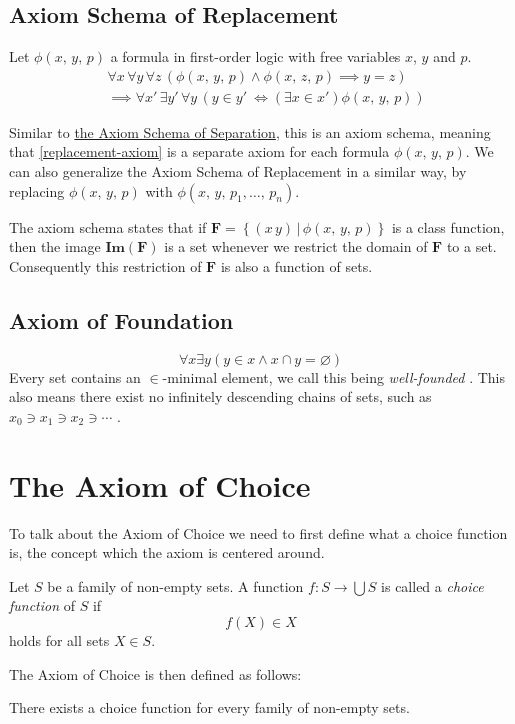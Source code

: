 \documentclass[../../main.tex]{subfiles}
\begin{document}
\subsection{Axiom Schema of Replacement}\label{ZF8}
Let $\phi(x,\, y,\, p)$ a formula in first-order logic with free variables $x$, $y$ and $p$.
\begin{align}\label{replacement-axiom}
    &\forall x\, \forall y\, \forall z\, \left(\phi(x,\, y,\, p) \wedge \phi(x,\, z,\, p) \implies y = z\right)\nonumber \\
    &\implies \forall x'\, \exists y'\, \forall y\, \left(y \in y'\ \iff \left(\exists x \in x'\right) \phi(x,\, y,\, p)\right)
\end{align}

Similar to \hyperref[ZF3]{the Axiom Schema of Separation}, this is an axiom schema, meaning that \eqref{replacement-axiom} is a separate axiom for each formula $\phi(x,\, y,\, p)$.
We can also generalize the Axiom Schema of Replacement in a similar way, by replacing $\phi(x,\, y,\, p)$ with $\phi(x,\, y,\, p_1,\ldots,\, p_n)$.

The axiom schema states that if $\mathbf{F} = \left\{(x\, y) \,\vert\, \phi(x,\, y,\, p)\right\}$ is a class function,
then the image $\mathbf{Im}(\mathbf{F})$ is a set whenever we restrict the domain of $\mathbf{F}$ to a set.
Consequently this restriction of $\mathbf{F}$ is also a function of sets. \cite[p.11]{Jec78}

\subsection{Axiom of Foundation}\label{ZF9}
$$\forall x \exists y \left(y \in x \wedge x \cap y = \varnothing \right)$$
Every set contains an $\in$-minimal element, we call this being \textit{well-founded} \cite[p.92]{Gol17}.
This also means there exist no infinitely descending chains of sets, such as $x_0 \ni x_1 \ni x_2 \ni \cdots$ \cite[Theorem 4.3, p.95]{Gol17}.

\section{The Axiom of Choice}
To talk about the Axiom of Choice we need to first define what a choice function is, the concept which the axiom is centered around.
\begin{definition}\cite[p.38]{Jec78}
    Let $S$ be a family of non-empty sets.
    A function $f: S \to \bigcup S$ is called a \textit{choice function} of $S$ if
    $$f(X) \in X$$
    holds for all sets $X \in S$.
\end{definition}
The Axiom of Choice is then defined as follows:
\begin{definition}\cite[p.38]{Jec78}\label{choice-axiom}
    There exists a choice function for every family of non-empty sets.
\end{definition}
\end{document}
